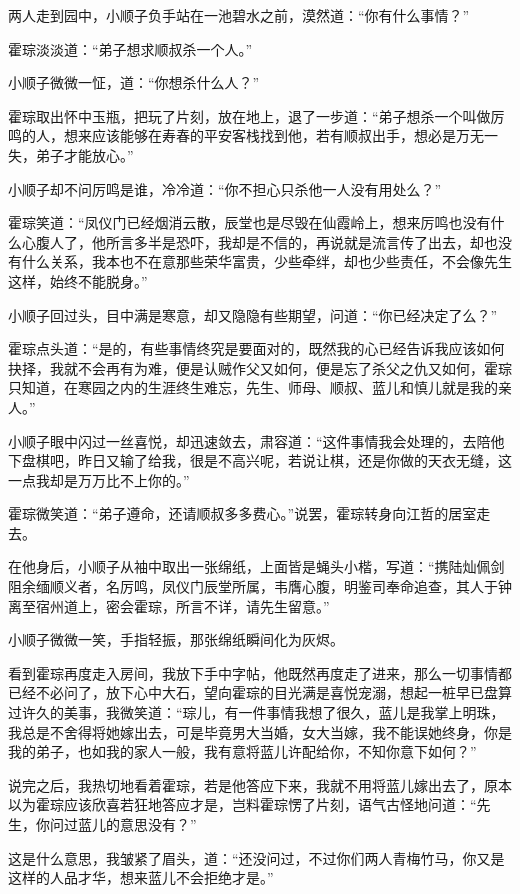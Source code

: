 两人走到园中，小顺子负手站在一池碧水之前，漠然道：“你有什么事情？”

霍琮淡淡道：“弟子想求顺叔杀一个人。”

小顺子微微一怔，道：“你想杀什么人？”

霍琮取出怀中玉瓶，把玩了片刻，放在地上，退了一步道：“弟子想杀一个叫做厉鸣的人，想来应该能够在寿春的平安客栈找到他，若有顺叔出手，想必是万无一失，弟子才能放心。”

小顺子却不问厉鸣是谁，冷冷道：“你不担心只杀他一人没有用处么？”

霍琮笑道：“凤仪门已经烟消云散，辰堂也是尽毁在仙霞岭上，想来厉鸣也没有什么心腹人了，他所言多半是恐吓，我却是不信的，再说就是流言传了出去，却也没有什么关系，我本也不在意那些荣华富贵，少些牵绊，却也少些责任，不会像先生这样，始终不能脱身。”

小顺子回过头，目中满是寒意，却又隐隐有些期望，问道：“你已经决定了么？”

霍琮点头道：“是的，有些事情终究是要面对的，既然我的心已经告诉我应该如何抉择，我就不会再有为难，便是认贼作父又如何，便是忘了杀父之仇又如何，霍琮只知道，在寒园之内的生涯终生难忘，先生、师母、顺叔、蓝儿和慎儿就是我的亲人。”

小顺子眼中闪过一丝喜悦，却迅速敛去，肃容道：“这件事情我会处理的，去陪他下盘棋吧，昨日又输了给我，很是不高兴呢，若说让棋，还是你做的天衣无缝，这一点我却是万万比不上你的。”

霍琮微笑道：“弟子遵命，还请顺叔多多费心。”说罢，霍琮转身向江哲的居室走去。

在他身后，小顺子从袖中取出一张绵纸，上面皆是蝇头小楷，写道：“携陆灿佩剑阻余缅顺义者，名厉鸣，凤仪门辰堂所属，韦膺心腹，明鉴司奉命追查，其人于钟离至宿州道上，密会霍琮，所言不详，请先生留意。”

小顺子微微一笑，手指轻振，那张绵纸瞬间化为灰烬。

看到霍琮再度走入房间，我放下手中字帖，他既然再度走了进来，那么一切事情都已经不必问了，放下心中大石，望向霍琮的目光满是喜悦宠溺，想起一桩早已盘算过许久的美事，我微笑道：“琮儿，有一件事情我想了很久，蓝儿是我掌上明珠，我总是不舍得将她嫁出去，可是毕竟男大当婚，女大当嫁，我不能误她终身，你是我的弟子，也如我的家人一般，我有意将蓝儿许配给你，不知你意下如何？”

说完之后，我热切地看着霍琮，若是他答应下来，我就不用将蓝儿嫁出去了，原本以为霍琮应该欣喜若狂地答应才是，岂料霍琮愣了片刻，语气古怪地问道：“先生，你问过蓝儿的意思没有？”

这是什么意思，我皱紧了眉头，道：“还没问过，不过你们两人青梅竹马，你又是这样的人品才华，想来蓝儿不会拒绝才是。”

